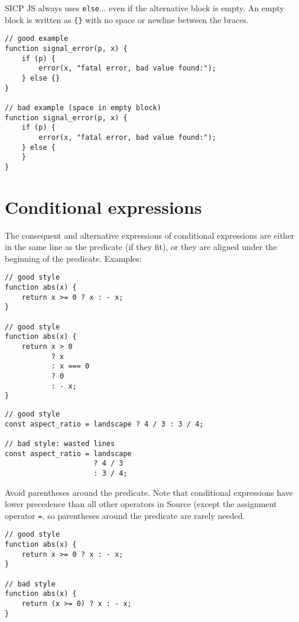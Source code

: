 SICP JS always uses \lstinline{else}... even if the alternative block
is empty. An empty block is written as \lstinline~{}~ with no space or newline
between the braces.

\begin{lstlisting}
// good example
function signal_error(p, x) {
    if (p) {
        error(x, "fatal error, bad value found:");
    } else {}
}

// bad example (space in empty block)
function signal_error(p, x) {
    if (p) {
        error(x, "fatal error, bad value found:");
    } else {
    }
}
\end{lstlisting}

\vspace{-4mm}

\section*{Conditional expressions}

The consequent and alternative expressions of conditional expressions are either
in the same line as the predicate (if they fit),
or they are aligned under the beginning of the predicate.
Examples:
\begin{lstlisting}
// good style
function abs(x) {
    return x >= 0 ? x : - x;
}

// good style
function abs(x) {
    return x > 0
           ? x
           : x === 0
           ? 0
           : - x;
}
\end{lstlisting}
\begin{lstlisting}
// good style
const aspect_ratio = landscape ? 4 / 3 : 3 / 4;

// bad style: wasted lines
const aspect_ratio = landscape
                     ? 4 / 3
                     : 3 / 4;
\end{lstlisting}

Avoid parentheses around the predicate. Note that conditional expressions have lower
precedence than all other operators in Source (except the assignment operator
\lstinline{=}, so parentheses around the predicate are rarely needed.

\begin{lstlisting}
// good style
function abs(x) {
    return x >= 0 ? x : - x;
}

// bad style
function abs(x) {
    return (x >= 0) ? x : - x;
}
\end{lstlisting}

